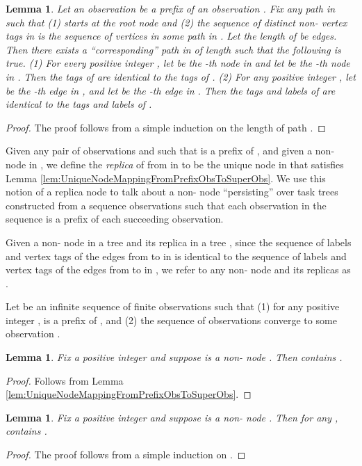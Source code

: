 \documentclass[11pt]{article}
\numberwithin{theorem}{section}
\newtheorem{lemma}[theorem]{Lemma}
\begin{document}
\begin{lemma}\label{lem:superObsYieldsSuperTree}
Let an observation  be a prefix of an observation . Fix any path  in  such that (1)  starts at the root node and (2) the sequence of distinct non- vertex tags in  is the sequence of vertices in some path in . Let the length of  be  edges. 
Then there exists a ``corresponding'' path  in  of length  such that the following is true. 
(1) For every positive integer , let  be the -th node in  and let  be the -th node in . Then the tags of  are identical to the tags of .
(2) For any positive integer , let  be the -th edge in , and let  be the -th edge in . Then the tags and labels of  are identical to the tags and labels of .
\end{lemma}
\begin{proof}
The proof follows from a simple induction on the length  of path . 
\end{proof}

Given any pair of observations  and  such that  is a prefix of , and given a non- node  in , we define the \emph{replica} of  from  in  to be the unique node  in  that satisfies Lemma  \ref{lem:UniqueNodeMappingFromPrefixObsToSuperObs}. We use this notion of a replica node to talk about a non- node ``persisting'' over task trees constructed from a sequence observations such that each observation in the sequence is a prefix of each succeeding observation.

Given a non- node  in a tree  and its replica  in a tree , since the sequence of labels and vertex tags of the edges from  to  in  is identical to the sequence of labels and vertex tags of the edges from  to  in , we refer to any non- node  and its replicas as .

Let  be an infinite sequence of finite observations such that (1) for any positive integer ,  is a prefix of , and (2) the sequence of observations converge to some observation .
\begin{lemma}\label{lem:nodePersistsOneHop}
Fix a positive integer  and suppose  is a non- node  . Then  contains .
\end{lemma}
\begin{proof}
Follows from Lemma \ref{lem:UniqueNodeMappingFromPrefixObsToSuperObs}.
\end{proof}

\begin{lemma}\label{lem:nodePersistsForEver}
Fix a positive integer  and suppose  is a non- node  . Then for any ,  contains .
\end{lemma}
\begin{proof}
The proof follows from a simple induction on .
\end{proof}
 
\end{document}
